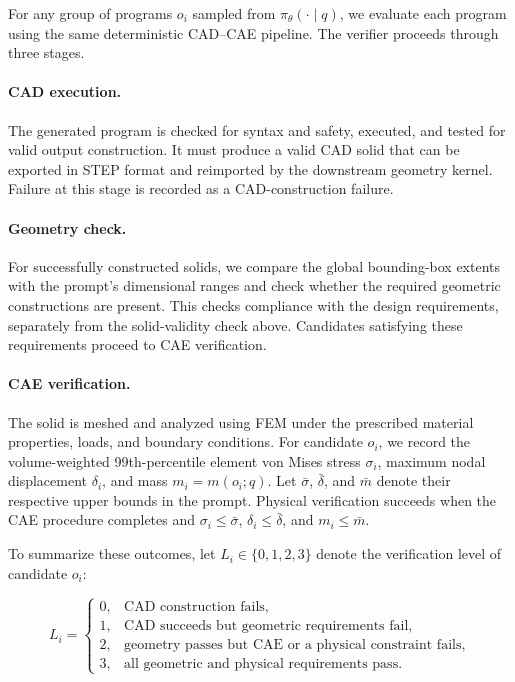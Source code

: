 For any group of programs \(o_i\) sampled from \(\pi_{\theta}(\cdot \mid q)\), we evaluate each program using the same deterministic CAD--CAE pipeline. The verifier proceeds through three stages.

\paragraph{CAD execution.}
The generated program is checked for syntax and safety, executed, and tested for valid output construction. It must produce a valid CAD solid that can be exported in STEP format and reimported by the downstream geometry kernel. Failure at this stage is recorded as a CAD-construction failure.

\paragraph{Geometry check.}
For successfully constructed solids, we compare the global bounding-box extents with the prompt's dimensional ranges and check whether the required geometric constructions are present. This checks compliance with the design requirements, separately from the solid-validity check above. Candidates satisfying these requirements proceed to CAE verification.

\paragraph{CAE verification.}
The solid is meshed and analyzed using FEM under the prescribed material properties, loads, and boundary conditions. For candidate \(o_i\), we record the volume-weighted 99th-percentile element von Mises stress \(\sigma_i\), maximum nodal displacement \(\delta_i\), and mass \(m_i=m(o_i;q)\). Let \(\bar\sigma\), \(\bar\delta\), and \(\bar m\) denote their respective upper bounds in the prompt. Physical verification succeeds when the CAE procedure completes and \(\sigma_i\leq\bar\sigma\), \(\delta_i\leq\bar\delta\), and \(m_i\leq\bar m\).

To summarize these outcomes, let \(L_i\in\{0,1,2,3\}\) denote the verification level of candidate \(o_i\):

\begin{equation}
L_i=
\begin{cases}
0, & \text{CAD construction fails},\\
1, & \text{CAD succeeds but geometric requirements fail},\\
2, & \text{geometry passes but CAE or a physical constraint fails},\\
3, & \text{all geometric and physical requirements pass}.
\end{cases}
\label{eq:level}
\end{equation}


